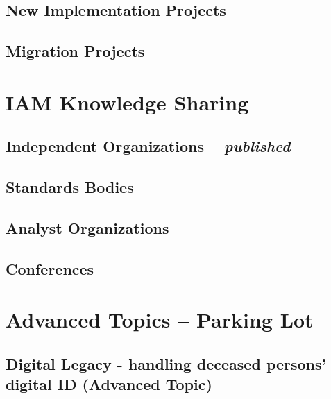 \hypertarget{new-implementation-projects}{%
\section{New Implementation
Projects}\label{new-implementation-projects}}

\hypertarget{migration-projects}{%
\section{Migration Projects}\label{migration-projects}}

\hypertarget{iam-knowledge-sharing}{%
\chapter{IAM Knowledge Sharing}\label{iam-knowledge-sharing}}

\hypertarget{independent-organizations-published}{%
\section{\texorpdfstring{Independent Organizations \emph{--
published}}{Independent Organizations -- published}}\label{independent-organizations-published}}

\hypertarget{standards-bodies}{%
\section{Standards Bodies}\label{standards-bodies}}

\hypertarget{analyst-organizations}{%
\section{Analyst Organizations}\label{analyst-organizations}}

\hypertarget{conferences}{%
\section{Conferences}\label{conferences}}

\hypertarget{advanced-topics-parking-lot}{%
\chapter{Advanced Topics -- Parking
Lot}\label{advanced-topics-parking-lot}}

\hypertarget{digital-legacy---handling-deceased-persons-digital-id-advanced-topic}{%
\section{Digital Legacy - handling deceased persons' digital ID
(Advanced
Topic)}\label{digital-legacy---handling-deceased-persons-digital-id-advanced-topic}}


